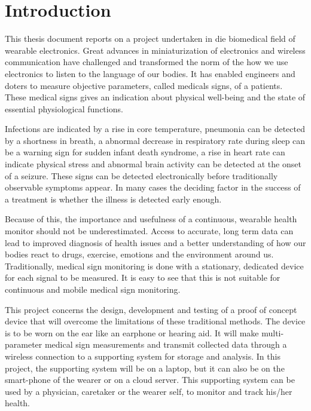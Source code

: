 \chapter{Introduction}
\label{chp:Intro}
This thesis document reports on a project undertaken in die biomedical field of wearable electronics. Great advances in miniaturization of electronics and wireless communication have challenged and transformed the norm of the how we use electronics to listen to the language of our bodies. It has enabled engineers and doters to measure objective parameters, called medicals signs, of a patients. These medical signs gives an indication about physical well-being and the state of essential physiological functions. 

Infections are indicated by a rise in core temperature, pneumonia can be detected by a shortness in breath, a abnormal decrease in respiratory rate during sleep can be a warning sign for sudden infant death syndrome, a rise in heart rate can indicate physical stress and abnormal brain activity can be detected at the onset of a seizure. These signs can be detected electronically before traditionally observable symptoms appear. In many cases the deciding factor in the success of a treatment is whether the illness is detected early enough.

\medskip

Because of this, the importance and usefulness of a continuous, wearable health monitor should not be underestimated. Access to accurate, long term data can lead to improved diagnosis of health issues and a better understanding of how our bodies react to drugs, exercise, emotions and the environment around us. Traditionally, medical sign monitoring is done with a stationary, dedicated device for each signal to be measured. It is easy to see that this is not suitable for continuous and mobile medical sign monitoring.

\medskip

This project concerns the design, development and testing of a proof of concept device that will overcome the limitations of these traditional methods. The device is to be worn on the ear like an earphone or hearing aid. It will make multi-parameter medical sign measurements and transmit collected data through a wireless connection to a supporting system for storage and analysis. In this project, the supporting system will be on a laptop, but it can also be on the smart-phone of the wearer or on a cloud server. This supporting system can be used by a physician, caretaker or the wearer self, to monitor and track his/her health.

